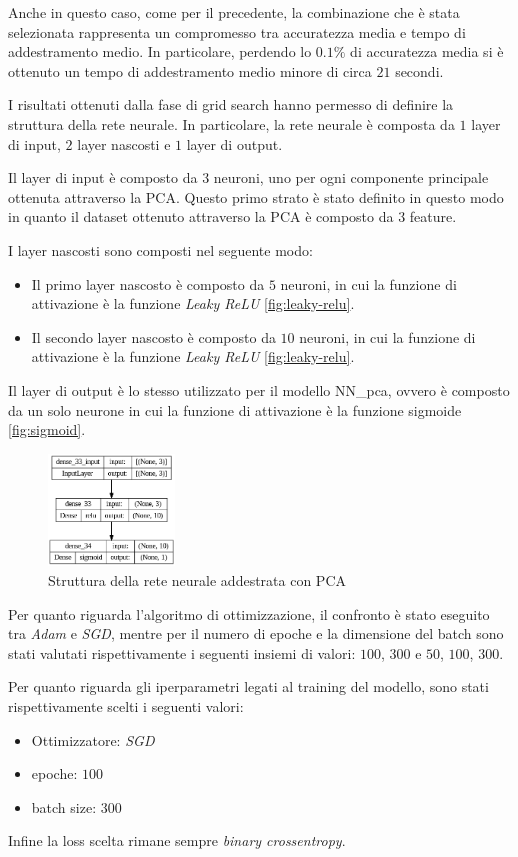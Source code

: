 Anche in questo caso, come per il precedente, la combinazione che è stata selezionata
rappresenta un compromesso tra accuratezza media e tempo di addestramento medio. In particolare,
perdendo lo $0.1\%$ di accuratezza media si è ottenuto un tempo di addestramento medio minore
di circa $21$ secondi.

I risultati ottenuti dalla fase di grid search hanno permesso di definire la
struttura della rete neurale. In particolare, la rete neurale è composta da $1$
layer di input, $2$ layer nascosti e $1$ layer di output.

Il layer di input è composto da $3$ neuroni, uno per ogni componente principale
ottenuta attraverso la PCA. Questo primo strato è stato definito in questo modo
in quanto il dataset ottenuto attraverso la PCA è composto da $3$ feature.

I layer nascosti sono composti nel seguente modo:
\begin{itemize}
    \item Il primo layer nascosto è composto da $5$ neuroni, in cui la funzione di
          attivazione è la funzione \textit{Leaky ReLU} \ref{fig:leaky-relu}.
    \item Il secondo layer nascosto è composto da $10$ neuroni, in cui la funzione
          di attivazione è la funzione \textit{Leaky ReLU} \ref{fig:leaky-relu}.
\end{itemize}

Il layer di output è lo stesso utilizzato per il modello NN\_pca, ovvero è composto 
da un solo neurone in cui la funzione di attivazione è la funzione sigmoide \ref{fig:sigmoid}.

\begin{figure}[!ht]
    \centering
    \includegraphics[width=0.3\textwidth]{img/rete/struttura_rete_pca.png}
    \caption{Struttura della rete neurale addestrata con PCA}
    \label{fig:strutturaReteNeuralePCA}
\end{figure}

Per quanto riguarda l'algoritmo di ottimizzazione, il confronto è stato eseguito
tra \textit{Adam} e \textit{SGD}, mentre per il numero di epoche e la dimensione
del batch sono stati valutati rispettivamente i seguenti insiemi di valori: $100$, $300$ e $50$,
$100$, $300$.

Per quanto riguarda gli iperparametri legati al training del modello, sono stati
rispettivamente scelti i seguenti valori:
\begin{itemize}
    \item Ottimizzatore: \textit{SGD}
    \item epoche: $100$
    \item batch size: $300$
\end{itemize}

Infine la loss scelta rimane sempre \textit{binary crossentropy}.